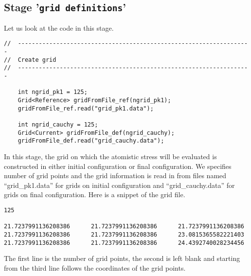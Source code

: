 \documentclass[authoryear]{elsarticle}
\newcommand{\ttt}{\texttt}
\begin{document}
\subsection{Stage \textnormal{'\ttt{grid definitions}'}}
Let us look at the code in this stage.
\begin{Verbatim}[frame=single]
//	-------------------------------------------------------------------
//	Create grid
//	-------------------------------------------------------------------

	int ngrid_pk1 = 125;
	Grid<Reference> gridFromFile_ref(ngrid_pk1);
	gridFromFile_ref.read("grid_pk1.data");

	int ngrid_cauchy = 125;
	Grid<Current> gridFromFile_def(ngrid_cauchy);
	gridFromFile_def.read("grid_cauchy.data");
\end{Verbatim}
In this stage, the grid on which the atomistic stress will be evaluated is
constructed in either initial configuration or final configuration.
We specifies number of grid points and the grid information is read in from files
named ``grid\_pk1.data'' for grids on initial configuration and ``grid\_cauchy.data''
for grids on final configuration.
Here is a snippet of the grid file.
\begin{Verbatim}[frame=single]
125

21.7237991136208386      21.7237991136208386      21.7237991136208386
21.7237991136208386      21.7237991136208386      23.0815365582221403
21.7237991136208386      21.7237991136208386      24.4392740028234456
\end{Verbatim}
The first line is the number of grid points, the second is left blank and starting from the third line follows the coordinates of the grid points.
\end{document}
